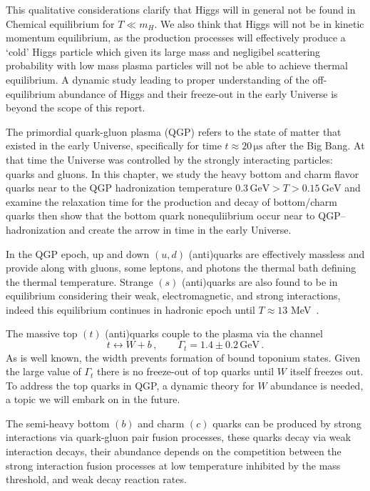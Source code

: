 This qualitative considerations clarify that Higgs will in general not be found in Chemical equilibrium for $T\ll m_H$. We also think that Higgs will not be in kinetic momentum equilibrium, as the production processes will effectively produce a `cold' Higgs particle which given its large mass and negligibel scattering probability with low mass plasma particles will not be able to achieve thermal equilibrium. A dynamic study leading to proper understanding of the off-equilibrium abundance of Higgs and their freeze-out in the early Universe is beyond the scope of this report. 

The primordial quark-gluon plasma (QGP) refers to the state of matter that existed in the early Universe, specifically for time $t\approx 20\, \mathrm{\mu s}$ after the Big Bang. At that time the Universe was controlled by the strongly interacting particles: quarks and gluons. In this chapter, we study the heavy bottom and charm flavor quarks near to the QGP hadronization temperature $0.3\,\mathrm{GeV}>T>0.15\,\mathrm{GeV}$ and examine the relaxation time for the production and decay of bottom/charm quarks then show that the bottom quark nonequliibrium occur near to QGP–hadronization and create the arrow in time in the early Universe.
  
In the QGP epoch, up and down $(u,d)$ (anti)quarks are effectively massless and provide along with gluons, some leptons, and photons the thermal bath defining the thermal temperature. Strange $(s)$ (anti)quarks are also found to be in equilibrium considering their  weak, electromagnetic, and strong interactions, indeed this equilibrium continues in hadronic epoch until $T\approx13$ MeV~\cite{Yang:2021bko}. 

The massive top $(t)$ (anti)quarks couple  to the plasma via the channel~\cite{ParticleDataGroup:2018ovx}
\begin{equation}
t\leftrightarrow W+b\,,\qquad \Gamma_t=1.4\pm0.2\,\mathrm{GeV}\,.
\end{equation}
As is well known, the width prevents formation of bound toponium states. Given the large value of $\Gamma_t$  there is no freeze-out of top quarks until $W$ itself freezes out. To address the top quarks in QGP, a dynamic theory for $W$ abundance is needed, a topic we will embark on in the future. 
 
The semi-heavy bottom $(b)$ and charm $(c)$ quarks can be produced by strong interactions via quark-gluon pair fusion processes, these quarks decay  via weak interaction decays,  their abundance depends on the competition between the strong interaction fusion processes at low temperature inhibited by the mass threshold, and weak decay reaction rates.


